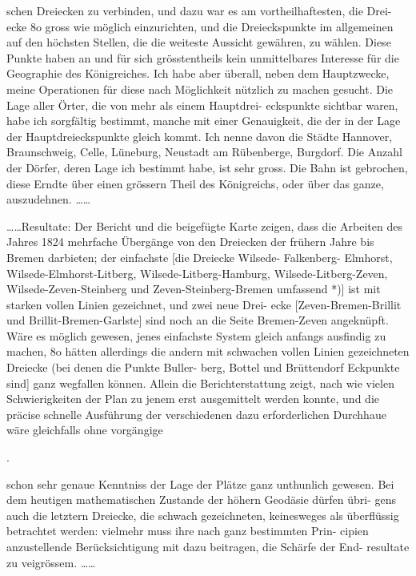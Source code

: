 \documentclass[12pt,a4paper]{article}
\theoremstyle{plain}
\theoremstyle{definition}
\theoremstyle{remark}
\begin{document}
\noindent

\noindent
schen Dreiecken zu verbinden, und dazu war es am vortheilhaftesten, die Drei-
ecke 8o gross wie möglich einzurichten, und die Dreieckspunkte im allgemeinen
auf den höchsten Stellen, die die weiteste Aussicht gewähren, zu wählen.
Diese Punkte haben an und für sich grösstentheils kein unmittelbares Interesse
für die Geographie des Königreiches. Ich habe aber überall, neben dem
Hauptzwecke, meine Operationen für diese nach Möglichkeit nützlich zu
machen gesucht. Die Lage aller Örter, die von mehr als einem Hauptdrei-
eckspunkte sichtbar waren, habe ich sorgfältig bestimmt, manche mit einer
Genauigkeit, die der in der Lage der Hauptdreieckspunkte gleich kommt. Ich
nenne davon die Städte Hannover, Braunschweig, Celle, Lüneburg, Neustadt
am Rübenberge, Burgdorf. Die Anzahl der Dörfer, deren Lage ich bestimmt
habe, ist sehr gross. Die Bahn ist gebrochen, diese Erndte über einen
grössern Theil des Königreichs, oder über das ganze, auszudehnen. \ldots\ldots


\noindent
\ldots\ldots Resultate: Der Bericht und die beigefügte Karte zeigen, dass
die Arbeiten des Jahres 1824 mehrfache Übergänge von den Dreiecken der
frühern Jahre bis Bremen darbieten; der einfachste [die Dreiecke Wilsede-
Falkenberg- Elmhorst, Wilsede-Elmhorst-Litberg, Wilsede-Litberg-Hamburg,
Wilsede-Litberg-Zeven, Wilsede-Zeven-Steinberg und Zeven-Steinberg-Bremen
umfassend *)] ist mit starken vollen Linien gezeichnet, und zwei neue Drei-
ecke [Zeven-Bremen-Brillit und Brillit-Bremen-Garlste] sind noch an die Seite
Bremen-Zeven angeknüpft. Wäre es möglich gewesen, jenes einfachste System
gleich anfangs ausfindig zu machen, 8o hätten allerdings die andern mit
schwachen vollen Linien gezeichneten Dreiecke (bei denen die Punkte Buller-
berg, Bottel und Brüttendorf Eckpunkte sind] ganz wegfallen können. Allein
die Berichterstattung zeigt, nach wie vielen Schwierigkeiten der Plan zu jenem
erst ausgemittelt werden konnte, und die präcise schnelle Ausführung der
verschiedenen dazu erforderlichen Durchhaue wäre gleichfalls ohne vorgängige

.

\noindent

\noindent

\noindent
schon sehr genaue Kenntniss der Lage der Plätze ganz unthunlich gewesen.
Bei dem heutigen mathematischen Zustande der höhern Geodäsie dürfen übri-
gens auch die letztern Dreiecke, die schwach gezeichneten, keinesweges als
überflüssig betrachtet werden: vielmehr muss ihre nach ganz bestimmten Prin-
cipien anzustellende Berücksichtigung mit dazu beitragen, die Schärfe der End-
resultate zu veigrössem. \ldots\ldots
\end{document}
